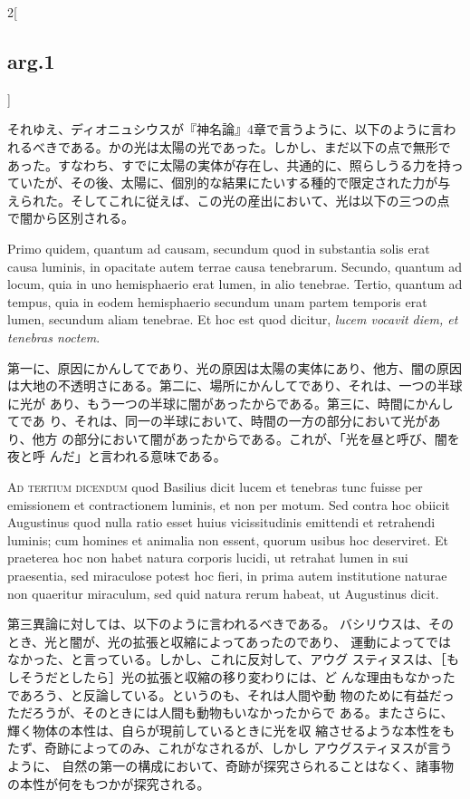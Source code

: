\documentclass[paper=a4paper,fontsize=10pt,jafontsize=9pt,titlepage]{jlreq}
\begin{document}
\begin{paracol}{2}[\subsection{arg.1}]
\switchcolumn

それゆえ、ディオニュシウスが『神名論』4章で言うように、以下のように言わ
 れるべきである。かの光は太陽の光であった。しかし、まだ以下の点で無形で
 あった。すなわち、すでに太陽の実体が存在し、共通的に、照らしうる力を持っ
 ていたが、その後、太陽に、個別的な結果にたいする種的で限定された力が与
 えられた。そしてこれに従えば、この光の産出において、光は以下の三つの点
 で闇から区別される。

\switchcolumn*

Primo quidem, quantum ad
causam, secundum quod in substantia solis erat causa luminis, in
opacitate autem terrae causa tenebrarum. Secundo, quantum ad locum, quia
in uno hemisphaerio erat lumen, in alio tenebrae. Tertio, quantum ad
tempus, quia in eodem hemisphaerio secundum unam partem temporis erat
lumen, secundum aliam tenebrae. Et hoc est quod dicitur, {\itshape lucem vocavit
diem, et tenebras noctem}.

\switchcolumn

第一に、原因にかんしてであり、光の原因は太陽の実体にあり、他方、闇の原因
 は大地の不透明さにある。第二に、場所にかんしてであり、それは、一つの半球に光が
 あり、もう一つの半球に闇があったからである。第三に、時間にかんしてであ
 り、それは、同一の半球において、時間の一方の部分において光があり、他方
 の部分において闇があったからである。これが、「光を昼と呼び、闇を夜と呼
 んだ」と言われる意味である。

\switchcolumn*[\subsection{s.c.}]

{\scshape Ad tertium dicendum} quod Basilius dicit lucem
et tenebras tunc fuisse per emissionem et contractionem luminis, et non
per motum. Sed contra hoc obiicit Augustinus quod nulla ratio esset
huius vicissitudinis emittendi et retrahendi luminis; cum homines et
animalia non essent, quorum usibus hoc deserviret. Et praeterea hoc non
habet natura corporis lucidi, ut retrahat lumen in sui praesentia, sed
miraculose potest hoc fieri, in prima autem institutione naturae non
quaeritur miraculum, sed quid natura rerum habeat, ut Augustinus
dicit.

\switchcolumn

第三異論に対しては、以下のように言われるべきである。
バシリウスは、そのとき、光と闇が、光の拡張と収縮によってあったのであり、
 運動によってではなかった、と言っている。しかし、これに反対して、アウグ
 スティヌスは、［もしそうだとしたら］光の拡張と収縮の移り変わりには、ど
 んな理由もなかったであろう、と反論している。というのも、それは人間や動
 物のために有益だっただろうが、そのときには人間も動物もいなかったからで
 ある。またさらに、輝く物体の本性は、自らが現前しているときに光を収
 縮させるような本性をもたず、奇跡によってのみ、これがなされるが、しかし
アウグスティヌスが言うように、 自然の第一の構成において、奇跡が探究さられることはなく、諸事物の本性が何をもつかが探究される。


\end{paracol}
\end{document}
